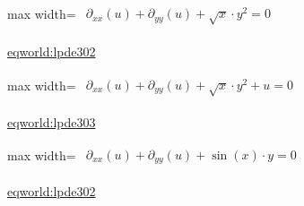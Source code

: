 \documentclass[UTF8,10pt,a4paper,fontset=mac]{ctexart}
\begin{document}
\begin{minipage}{\linewidth}\begin{center}\begin{adjustbox}{max width=\linewidth}$\displaystyle\begin{gathered}\begin{gathered}\partial_{xx}(u)+\partial_{yy}(u)+\sqrt{x}\cdot y^{2}=0\end{gathered}\end{gathered}$\end{adjustbox}\end{center}{\small\href{https://eqworld.ipmnet.ru/en/solutions/lpde/lpde302.pdf}{eqworld:lpde302}}\par\end{minipage}\par\vspace{6mm}

\begin{minipage}{\linewidth}\begin{center}\begin{adjustbox}{max width=\linewidth}$\displaystyle\begin{gathered}\begin{gathered}\partial_{xx}(u)+\partial_{yy}(u)+\sqrt{x}\cdot y^{2}+u=0\end{gathered}\end{gathered}$\end{adjustbox}\end{center}{\small\href{https://eqworld.ipmnet.ru/en/solutions/lpde/lpde303.pdf}{eqworld:lpde303}}\par\end{minipage}\par\vspace{6mm}

\begin{minipage}{\linewidth}\begin{center}\begin{adjustbox}{max width=\linewidth}$\displaystyle\begin{gathered}\begin{gathered}\partial_{xx}(u)+\partial_{yy}(u)+\sin(x)\cdot y=0\end{gathered}\end{gathered}$\end{adjustbox}\end{center}{\small\href{https://eqworld.ipmnet.ru/en/solutions/lpde/lpde302.pdf}{eqworld:lpde302}}\par\end{minipage}\par\vspace{6mm}
\end{document}
